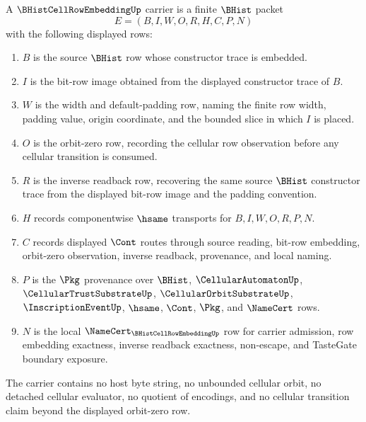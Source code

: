 \begin{definition}
\label{def:bhist-cell-row-embedding-carrier}
A $\BHistCellRowEmbeddingUp$ carrier is a finite $\BHist$ packet
$$
E=(B,I,W,O,R,H,C,P,N)
$$
with the following displayed rows:
\begin{enumerate}
\item $B$ is the source $\BHist$ row whose constructor trace is embedded.
\item $I$ is the bit-row image obtained from the displayed constructor trace of $B$.
\item $W$ is the width and default-padding row, naming the finite row width, padding value, origin coordinate, and the bounded slice in which $I$ is placed.
\item $O$ is the orbit-zero row, recording the cellular row observation before any cellular transition is consumed.
\item $R$ is the inverse readback row, recovering the same source $\BHist$ constructor trace from the displayed bit-row image and the padding convention.
\item $H$ records componentwise $\hsame$ transports for $B,I,W,O,R,P,N$.
\item $C$ records displayed $\Cont$ routes through source reading, bit-row embedding, orbit-zero observation, inverse readback, provenance, and local naming.
\item $P$ is the $\Pkg$ provenance over $\BHist$, $\CellularAutomatonUp$, $\CellularTrustSubstrateUp$, $\CellularOrbitSubstrateUp$, $\InscriptionEventUp$, $\hsame$, $\Cont$, $\Pkg$, and $\NameCert$ rows.
\item $N$ is the local $\NameCert_{\BHistCellRowEmbeddingUp}$ row for carrier admission, row embedding exactness, inverse readback exactness, non-escape, and TasteGate boundary exposure.
\end{enumerate}
The carrier contains no host byte string, no unbounded cellular orbit, no detached cellular evaluator, no quotient of encodings, and no cellular transition claim beyond the displayed orbit-zero row.
\end{definition}

